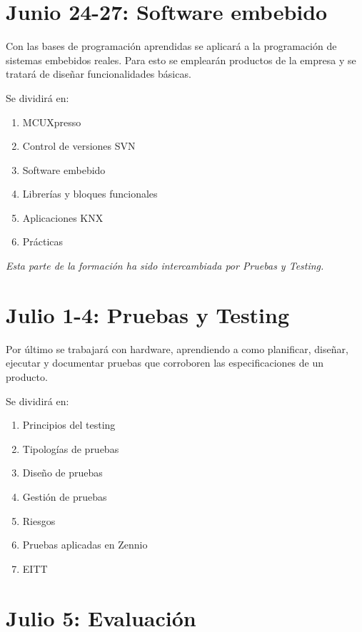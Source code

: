 \section*{Junio 24-27: Software embebido}
\label{sec:jun24-27}

Con las bases de programación aprendidas se aplicará a la programación de sistemas embebidos reales. Para esto se emplearán productos de la empresa y se tratará de diseñar funcionalidades básicas.

Se dividirá en:

\begin{enumerate}
    \item MCUXpresso
    \item Control de versiones SVN
    \item Software embebido
    \item Librerías y bloques funcionales
    \item Aplicaciones KNX
    \item Prácticas
\end{enumerate}

\emph{Esta parte de la formación ha sido intercambiada por Pruebas y Testing.}

\section*{Julio 1-4: Pruebas y Testing}
\label{sec:jul1-4}

Por último se trabajará con hardware, aprendiendo a como planificar, diseñar, ejecutar y documentar pruebas que corroboren las especificaciones de un producto.

Se dividirá en:
\begin{enumerate}
    \item Principios del testing
    \item Tipologías de pruebas
    \item Diseño de pruebas
    \item Gestión de pruebas
    \item Riesgos
    \item Pruebas aplicadas en Zennio
    \item EITT
\end{enumerate}

\section*{Julio 5: Evaluación}
\label{sec:jul5}

